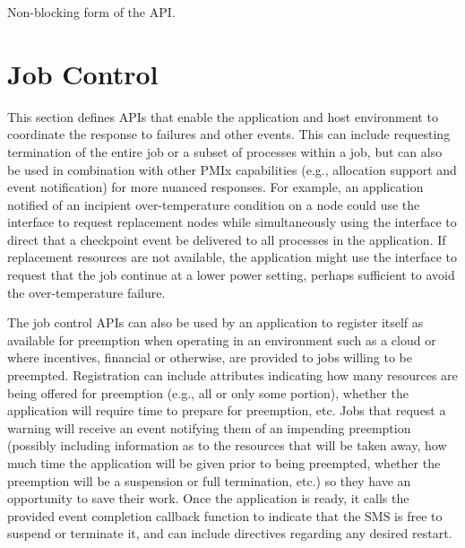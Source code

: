 \optattrend

\descr

Non-blocking form of the  \ac{API}.


\section{Job Control}
\label{chap:api_job_mgmt:jctrl}

This section defines \acp{API} that enable the application and host environment to coordinate the response to failures and other events.
This can include requesting termination of the entire job or a subset of processes within a job, but can
also be used in combination with other \ac{PMIx} capabilities (e.g., allocation support and event notification) for more nuanced responses. For example, an application notified of an incipient over-temperature condition on a node could use the  interface to request replacement nodes while simultaneously using the  interface to direct that a checkpoint event be delivered to all processes in the application. If replacement resources are not available, the application might use the  interface to request that the job continue at a lower power setting, perhaps sufficient to avoid the over-temperature failure.

The job control \acp{API} can also be used by an application to register itself as available for preemption when operating in an environment such as a cloud or where incentives, financial or otherwise, are provided to jobs willing to be preempted. Registration can include attributes indicating how many resources are being offered for preemption (e.g., all or only some portion), whether the application will require time to prepare for preemption, etc. Jobs that
request a warning will receive an event notifying them of an impending preemption (possibly including information as to the resources that will be taken away, how much time the application will be given prior to being preempted, whether the preemption will be a suspension or full termination, etc.) so they have an opportunity to save
their work. Once the application is ready, it calls the provided event completion callback function to indicate that
the SMS is free to suspend or terminate it, and can include directives regarding any desired restart.

